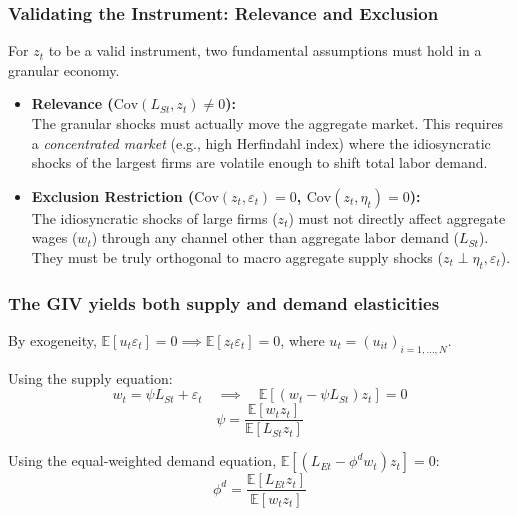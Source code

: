 \documentclass[aspectratio=169,11pt]{beamer}
\begin{document}
\begin{frame}
    \frametitle{Validating the Instrument: Relevance and Exclusion}

    \vspace{0.3cm}
    {\Large
        For $z_t$ to be a valid instrument, two fundamental assumptions must hold in a granular economy.
    }

    \vspace{0.8cm}
    \begin{itemize}
        \item \textbf{Relevance ($\text{Cov}(L_{St}, z_t) \neq 0$):}\\
              \vspace{0.2cm}
              The granular shocks must actually move the aggregate market. This requires a \emph{concentrated market} (e.g., high Herfindahl index) where the idiosyncratic shocks of the largest firms are volatile enough to shift total labor demand.

              \vspace{0.6cm}
        \item \textbf{Exclusion Restriction ($\text{Cov}(z_t, \varepsilon_t) = 0$, $\text{Cov}(z_t, \eta_t) = 0$):}\\
              \vspace{0.2cm}
              The idiosyncratic shocks of large firms ($z_t$) must not directly affect aggregate wages ($w_t$) through any channel other than aggregate labor demand ($L_{St}$). They must be truly orthogonal to macro aggregate supply shocks ($z_t \perp \eta_t, \varepsilon_t$).
    \end{itemize}

\end{frame}

\begin{frame} \label{src_psi_identification}
    \frametitle{The GIV yields both supply and demand elasticities}

    \vspace{0.5cm}
    By exogeneity, $\mathbb{E}[u_t \varepsilon_t] = 0 \implies \mathbb{E}[z_t \varepsilon_t] = 0$, where $u_t = (u_{it})_{i=1,\dots,N}$.

    \vspace{0.5cm}
    Using the supply equation:
    \begin{equation*}
        w_t = \psi L_{St} + \varepsilon_t \quad \implies \quad \mathbb{E}[(w_t - \psi L_{St}) z_t] = 0
    \end{equation*}
    \begin{equation*}
        \psi = \frac{\mathbb{E}[w_t z_t]}{\mathbb{E}[L_{St} z_t]} \tag{Supply Elasticity}
    \end{equation*}
    \hyperlink{app_psi_identification}{}

    \vspace{0.5cm}
    Using the equal-weighted demand equation, $\mathbb{E}[(L_{Et} - \phi^d w_t) z_t] = 0$:
    \begin{equation*}
        \phi^d = \frac{\mathbb{E}[L_{Et} z_t]}{\mathbb{E}[w_t z_t]} \tag{Demand Elasticity}
    \end{equation*}

\end{frame}
\end{document}
